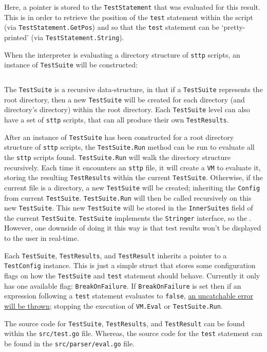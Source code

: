 Here, a pointer is stored to the \verb|TestStatement| that was evaluated for this result. This is in order to retrieve the position of the \verb|test| statement within the script (via \verb|TestStatement.GetPos|) and so that the \verb|test| statement can be `pretty-printed' (via \verb|TestStatement.String|).

When the interpreter is evaluating a directory structure of \verb|sttp| scripts, an instance of \verb|TestSuite| will be constructed:

\inputminted[firstline=88, lastline=98, autogobble, breaklines, tabsize=4]{go}{../../src/test.go}

The \verb|TestSuite| is a recursive data-structure, in that if a \verb|TestSuite| represents the root directory, then a new \verb|TestSuite| will be created for each directory (and directory's directory) within the root directory. Each \verb|TestSuite| level can also have a set of \verb|sttp| scripts, that can all produce their own \verb|TestResults|.

After an instance of \verb|TestSuite| has been constructed for a root directory structure of \verb|sttp| scripts, the \verb|TestSuite.Run| method can be run to evaluate all the \verb|sttp| scripts found. \verb|TestSuite.Run| will walk the directory structure recursively. Each time it encounters an \verb|sttp| file, it will create a \verb|VM| to evaluate it, storing the resulting \verb|TestResults| within the current \verb|TestSuite|. Otherwise, if the current file is a directory, a new \verb|TestSuite| will be created; inheriting the \verb|Config| from current \verb|TestSuite|. \verb|TestSuite.Run| will then be called recursively on this new \verb|TestSuite|. This new \verb|TestSuite| will be stored in the \verb|InnerSuites| field of the current \verb|TestSuite|. \verb|TestSuite| implements the \verb|Stringer| interface, so the . However, one downside of doing it this way is that test results won't be displayed to the user in real-time.

Each \verb|TestSuite|, \verb|TestResults|, and \verb|TestResult| inherits a pointer to a \verb|TestConfig| instance. This is just a simple struct that stores some configuration flags on how the \verb|TestSuite| and \verb|test| statement should behave. Currently it only has one available flag: \verb|BreakOnFailure|. If \verb|BreakOnFailure| is set then if an expression following a \verb|test| statement evaluates to \verb|false|, \hyperref[sec:development-try-catch-throw-errors-context]{an uncatchable error will be thrown}; stopping the execution of \verb|VM.Eval| or \verb|TestSuite.Run|.

The source code for \verb|TestSuite|, \verb|TestResults|, and \verb|TestResult| can be found within the \verb|src/test.go| file. Whereas, the source code for the \verb|test| statement can be found in the \verb|src/parser/eval.go| file.
